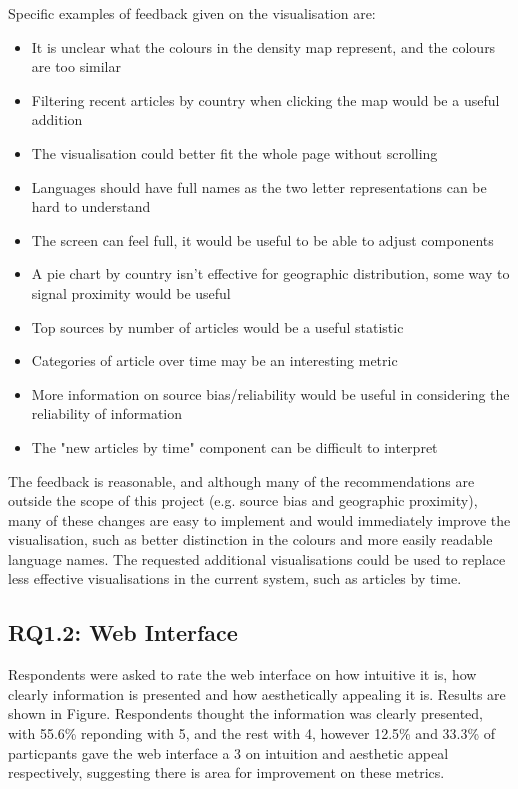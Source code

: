 \documentclass{l4proj}
\begin{document}
Specific examples of feedback given on the visualisation are:
\begin{itemize}
    \item It is unclear what the colours in the density map represent, and the colours are too similar
    \item Filtering recent articles by country when clicking the map would be a useful addition
    \item The visualisation could better fit the whole page without scrolling
    \item Languages should have full names as the two letter representations can be hard to understand
    \item The screen can feel full, it would be useful to be able to adjust components
    \item A pie chart by country isn't effective for geographic distribution, some way to signal proximity would be useful
    \item Top sources by number of articles would be a useful statistic
    \item Categories of article over time may be an interesting metric
    \item More information on source bias/reliability would be useful in considering the reliability of information
    \item The "new articles by time" component can be difficult to interpret
\end{itemize}

The feedback is reasonable, and although many of the recommendations are outside the scope of this project (e.g. source bias and geographic proximity), many of these changes are easy to implement and would immediately improve the visualisation, such as better distinction in the colours and more easily readable language names. The requested additional visualisations could be used to replace less effective visualisations in the current system, such as articles by time.

\subsection{RQ1.2: Web Interface}
Respondents were asked to rate the web interface on how intuitive it is, how clearly information is presented and how aesthetically appealing it is. Results are shown in Figure. Respondents thought the information was clearly presented, with 55.6\% reponding with 5, and the rest with 4, however 12.5\% and 33.3\% of particpants gave the web interface a 3 on intuition and aesthetic appeal respectively, suggesting there is area for improvement on these metrics. 
\end{document}

